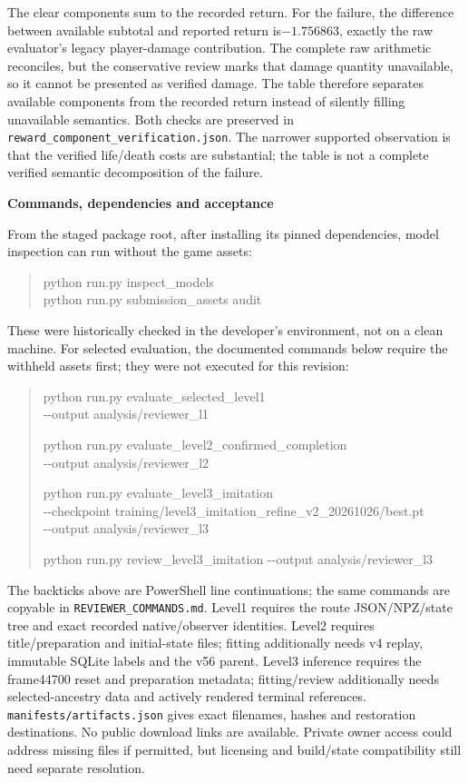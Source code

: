 \documentclass[11pt,a4paper]{article}
\newcommand{\topic}[2]{\vspace*{-4mm}{\small\color{teal}\textbf{#1}}\par{\LARGE\bfseries #2}\par\vspace{3mm}}
\newcommand{\pathref}[1]{\nolinkurl{#1}}
\begin{document}
The clear components sum to the recorded return. For the failure, the difference between available subtotal and reported return is$-1.756863$, exactly the raw evaluator's legacy player-damage contribution. The complete raw arithmetic reconciles, but the conservative review marks that damage quantity unavailable, so it cannot be presented as verified damage. The table therefore separates available components from the recorded return instead of silently filling unavailable semantics. Both checks are preserved in \pathref{reward_component_verification.json}. The narrower supported observation is that the verified life/death costs are substantial; the table is not a complete verified semantic decomposition of the failure.

\clearpage
\topic{APPENDIX G / REVIEWER EXECUTION}{Commands, dependencies and acceptance}
\small
From the staged package root, after installing its pinned dependencies, model inspection can run without the game assets:
\begin{quote}\ttfamily
python run.py inspect\_models\\
python run.py submission\_assets audit
\end{quote}
These were historically checked in the developer's environment, not on a clean machine. For selected evaluation, the documented commands below require the withheld assets first; they were not executed for this revision:
\begin{quote}\ttfamily\small\raggedright
python run.py evaluate\_selected\_level1 \textasciigrave{}\\
\quad -{}-output analysis/reviewer\_l1\par\medskip
python run.py evaluate\_level2\_confirmed\_completion \textasciigrave{}\\
\quad -{}-output analysis/reviewer\_l2\par\medskip
python run.py evaluate\_level3\_imitation \textasciigrave{}\\
\quad -{}-checkpoint training/level3\_imitation\_refine\_v2\_20261026/best.pt \textasciigrave{}\\
\quad -{}-output analysis/reviewer\_l3\par\medskip
python run.py review\_level3\_imitation -{}-output analysis/reviewer\_l3
\end{quote}
The backticks above are PowerShell line continuations; the same commands are copyable in \pathref{REVIEWER_COMMANDS.md}.
Level1 requires the route JSON/NPZ/state tree and exact recorded native/observer identities. Level2 requires title/preparation and initial-state files; fitting additionally needs v4 replay, immutable SQLite labels and the v56 parent. Level3 inference requires the frame44700 reset and preparation metadata; fitting/review additionally needs selected-ancestry data and actively rendered terminal references. \pathref{manifests/artifacts.json} gives exact filenames, hashes and restoration destinations. No public download links are available. Private owner access could address missing files if permitted, but licensing and build/state compatibility still need separate resolution.
\end{document}
